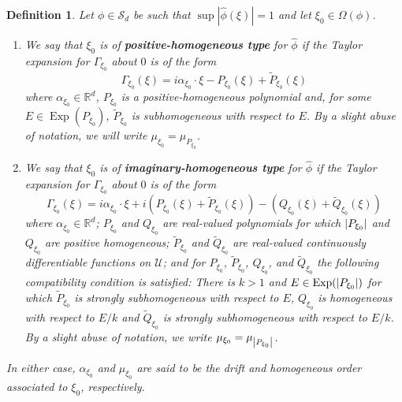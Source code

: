 \documentclass[11pt]{article}
\newtheorem{definition}[theorem]{Definition}
\newcommand\Exp{\operatorname{Exp}}
\begin{document}
\begin{definition}\label{def:Types}
Let $\phi\in\mathcal{S}_d$ be such that $\sup|\widehat{\phi}(\xi)|=1$ and let $\xi_0\in\Omega(\phi)$. 
\begin{enumerate}
    \item We say that $\xi_0$ is of \textbf{positive-homogeneous type} for $\widehat{\phi}$ if the Taylor expansion for $\Gamma_{\xi_0}$ about $0$ is of the form
\begin{equation}\label{eq:PosHomType}
\Gamma_{\xi_0}(\xi)=i\alpha_{\xi_0}\cdot\xi-P_{\xi_0}(\xi)+\widetilde{P}_{\xi_0}(\xi)
\end{equation}
where $\alpha_{\xi_0}\in\mathbb{R}^d$, $P_{\xi_0}$ is a positive-homogeneous polynomial and, for some $E\in \Exp(P_{\xi_0})$, $\widetilde{P}_{\xi_0}$ is subhomogeneous with respect to $E$. By a slight abuse of notation, we will write $\mu_{\xi_0}=\mu_{P_{\xi_0}}$.
\item We say that $\xi_0$ is of \textbf{imaginary-homogeneous type} for $\widehat{\phi}$ if the Taylor expansion for $\Gamma_{\xi_0}$ about $0$ is of the form
\begin{equation*}
    \Gamma_{\xi_0}(\xi)=i\alpha_{\xi_0}\cdot\xi +i\left(P_{\xi_0}(\xi)+\widetilde{P}_{\xi_0}(\xi)\right)-\left(Q_{\xi_0}(\xi)+\widetilde{Q}_{\xi_0}(\xi)\right)
\end{equation*}
where $\alpha_{\xi_0}\in\mathbb{R}^d$; $P_{\xi_0}$ and $Q_{\xi_0}$ are real-valued polynomials for which $\abs{P_{\xi_0}}$ and $Q_{\xi_0}$ are positive homogeneous; $\widetilde{P}_{\xi_0}$ and $\widetilde{Q}_{\xi_0}$ are real-valued continuously differentiable functions on $\mathcal{U}$; and for $P_{\xi_0}$, $\widetilde{P}_{\xi_0}$, $Q_{\xi_0}$, and $\widetilde{Q}_{\xi_0}$ the following compatibility condition is satisfied: There is $k>1$ and $E\in\Exp(\abs{P_{\xi_0}})$ for which $\widetilde{P}_{\xi_0}$ is strongly subhomogeneous with respect to $E$, $Q_{\xi_0}$ is homogeneous with respect to $E/k$ and $\widetilde{Q}_{\xi_0}$ is strongly subhomogeneous with respect to $E/k$.  By a slight abuse of notation, we write $\mu_{\xi_0}=\mu_{\abs{P_{\xi_0}}}$.
\end{enumerate}
In either case, $\alpha_{\xi_0}$ and $\mu_{\xi_0}$ are said to be the drift and homogeneous order associated to $\xi_0$, respectively.
\end{definition}
\noindent 
\end{document}
